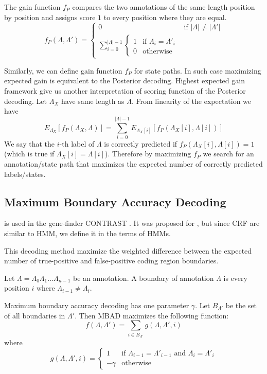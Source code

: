 The gain function $f_P$ compares the two annotations of the same length position
by position and assigns score $1$ to every position where they are equal.
\begin{equation}
f_P(\Lambda,\Lambda') = 
\begin{cases}
0 & \text{if $|\Lambda|\not=|\Lambda'|$}\\
\sum_{i=0}^{|\Lambda|-1}\begin{cases}
1 & \text{if $\Lambda_i=\Lambda'_i$}\\
0 & \text{otherwise}
\end{cases}
\end{cases}
\end{equation}

Similarly, we can define gain function $f_P$ for state paths. In such case
maximizing expected gain is equivalent to the Posterior decoding. Highest
expected gain framework give us another interpretation of scoring function of
the Posterior decoding. Let $\Lambda_X$  have same length as $\Lambda$. From
linearity of the expectation we have \[E_{\Lambda_X}[f_P(\Lambda_X,\Lambda)] =
\sum_{i=0}^{|\Lambda|-1}E_{\Lambda_X[i]}[f_P(\Lambda_X[i],\Lambda[i])]\] We say
that the $i$-th label of $\Lambda$ is correctly predicted if
$f_P(\Lambda_X[i],\Lambda[i])=1$ (which is true if $\Lambda_X[i]=\Lambda[i]$). Therefore  by maximizing $f_P$ we search for
an annotation/state path that maximizes the expected number of correctly
predicted labels/states.

\subsection{Maximum Boundary Accuracy Decoding}

 is used in the gene-finder
CONTRAST \cite{Gross2007}. It
was proposed for , but since CRF
are similar to HMM, we define it in the terms of HMMs.

This decoding method  maximize the weighted difference between the expected
number of true-positive and false-positive coding region boundaries.

\begin{definition}
Let $\Lambda=\Lambda_0\Lambda_1\dots\Lambda_{n-1}$ be an annotation. A boundary of
annotation $\Lambda$ is every position $i$ where $\Lambda_{i-1}\not=\Lambda_i$. 
\end{definition}

Maximum boundary accuracy decoding has one parameter $\gamma$. Let $B_{\Lambda'}$ be the
set of all boundaries in $\Lambda'$. Then MBAD maximizes the following function:
\begin{equation}
f(\Lambda,\Lambda')=\sum_{i\in B_{\Lambda'}}g(\Lambda,\Lambda',i)
\end{equation}
where 
\begin{equation}
g(\Lambda,\Lambda',i)=
\begin{cases}
1 & \text{if $\Lambda_{i-1}=\Lambda'_{i-1}$ and $\Lambda_{i}=\Lambda'_{i}$}\\
-\gamma& \text{otherwise}
\end{cases}
\end{equation}

